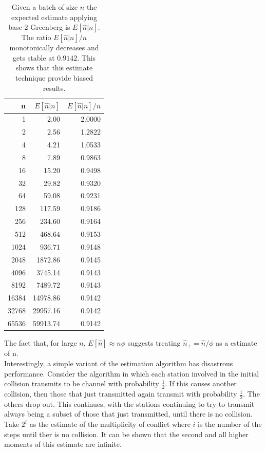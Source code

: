 \documentclass[12pt,a4paper]{report}
\begin{document}
\begin{table}[H]
\caption[\emph{Basic Greenberg}: Expected Estimate]{Given a batch of size $n$ the expected estimate applying base 2 Greenberg is $E[\hat{n}|n]$. The ratio $E[\hat{n}|n]/n$ monotonically decreases and gets stable at $0.9142$. This shows that this estimate technique provide biased results.}
\begin{center}
\begin{tabular}{rD{.}{.}{5.2}D{.}{.}{1.4}}
 n &  &  \\ \hline {} &     2.00 &   2.0000 \\ 
2 &     2.56 &   1.2822 \\ 
4 &     4.21 &   1.0533 \\ 
8 &     7.89 &   0.9863 \\ 
16 &  15.20 &   0.9498 \\ 
32 &    29.82 &   0.9320 \\ 
64 &    59.08 &   0.9231 \\ 
128 &   117.59 &   0.9186 \\ 
256 &   234.60 &   0.9164 \\ 
512 &   468.64 &   0.9153 \\ 
1024 &   936.71 &   0.9148 \\ 
2048 &  1872.86 &   0.9145 \\ 
4096 &  3745.14 &   0.9143 \\ 
8192 &  7489.72 &   0.9143 \\ 
16384 & 14978.86 &   0.9142 \\ 
32768 & 29957.16 &   0.9142 \\ 
65536 & 59913.74 &   0.9142
\end{tabular}
\end{center}
\label{table:phi-Phi}
\end{table}
The fact that, for large $n$, $E[\hat{n}] \approx n\phi$ suggests treating $\hat{n}_{+} = \hat{n}/\phi$ as a estimate of n.\\


Interestingly, a simple variant of the estimation algorithm has disastrous performance. Consider the algorithm in which each station involved in the initial collision transmits to he channel with probability $\frac{1}{2}$. If this causes another collision, then those that just transmitted again transmit with probability $\frac{1}{2}$. The others drop out. This continues, with the stations continuing to try to transmit always being a subset of those that just transmitted, until there is no collision. Take $2^{i}$ as the estimate of the multiplicity of conflict where $i$ is the number of the steps until ther is no collision. It can be shown that the second and all higher moments of this estimate are infinite.
\end{document}
